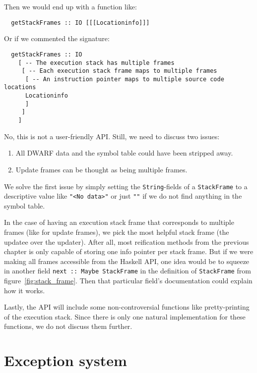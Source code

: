Then we would end up with a function like:

\begin{verbatim}
  getStackFrames :: IO [[[Locationinfo]]]
\end{verbatim}

Or if we commented the signature:

\begin{verbatim}
  getStackFrames :: IO
    [ -- The execution stack has multiple frames
     [ -- Each execution stack frame maps to multiple frames
      [ -- An instruction pointer maps to multiple source code locations
      Locationinfo
      ]
     ]
    ]
\end{verbatim}

No, this is not a user-friendly API. Still, we need to discuss two issues:

\begin{enumerate}
  \item
    All DWARF data and the symbol table could have been stripped away.
  \item
    Update frames can be thought as being multiple frames.
\end{enumerate}

We solve the first issue by simply setting the \texttt{String}-fields of
a \texttt{StackFrame} to a descriptive value like \texttt{"<No data>"}
or just \texttt{""} if we do not find anything in the symbol table.

In the case of having an execution stack frame that corresponds to multiple
frames (like for update frames), we pick the most helpful stack frame (the
updatee over the updater).  After all, most reification methods from the
previous chapter is only capable of storing one info pointer per stack frame.
But if we were making all frames accessible from the Haskell API, one idea
would be to squeeze in another field \texttt{next :: Maybe StackFrame} in the
definition of \texttt{StackFrame} from figure~\ref{fig:stack_frame}.  Then that
particular field's documentation could explain how it works.

Lastly, the API will include some non-controversial functions like
pretty-printing of the execution stack.  Since there is only one natural
implementation for these functions, we do not discuss them further.

\section{Exception system} \label{sec:exception_system}

